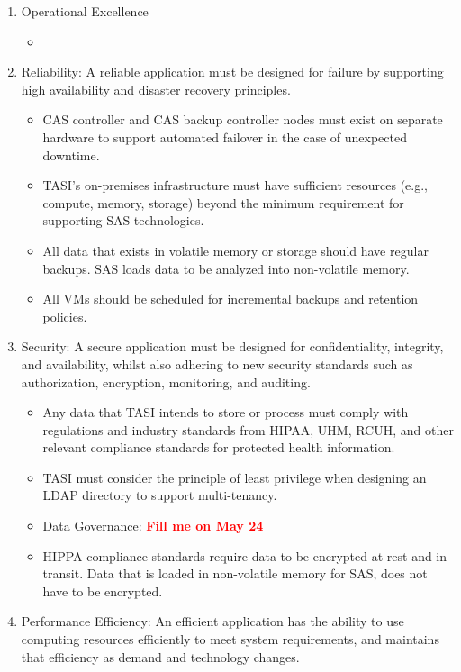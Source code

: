 \begin{enumerate}
    \item Operational Excellence
    \begin{itemize}
        \item 
    \end{itemize}
    \item Reliability: A reliable application must be designed for failure by supporting high availability and disaster recovery principles. 
    \begin{itemize}
        \item CAS controller and CAS backup controller nodes must exist on separate hardware to support automated failover in the case of unexpected downtime. 
        \item TASI's on-premises infrastructure must have sufficient resources (e.g., compute, memory, storage) beyond the minimum requirement for supporting SAS technologies.
        \item All data that exists in volatile memory or storage should have regular backups. SAS loads data to be analyzed into non-volatile memory.
        \item All VMs should be scheduled for incremental backups and retention policies. 
    \end{itemize}
    \item Security: A secure application must be designed for confidentiality, integrity, and availability, whilst also adhering to new security standards such as authorization, encryption, monitoring, and auditing.
    \begin{itemize}
        \item Any data that TASI intends to store or process must comply with regulations and industry standards from HIPAA, UHM, RCUH, and other relevant compliance standards for protected health information.
        \item TASI must consider the principle of least privilege when designing an LDAP directory to support multi-tenancy.
        \item Data Governance: \textbf{\textcolor{red}{Fill me on May 24}}
        \item HIPPA compliance standards require data to be encrypted at-rest and in-transit. Data that is loaded in non-volatile memory for SAS, does not have to be encrypted. 
        \end{itemize}
    \item Performance Efficiency: An efficient application has the ability to use computing resources efficiently to meet system requirements, and maintains that efficiency as demand and technology changes.

\end{enumerate}
